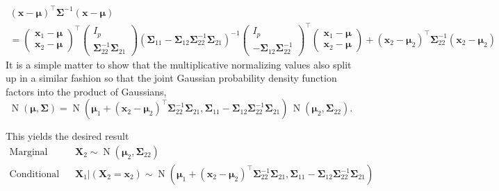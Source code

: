 \documentclass[12pt, twoside, draft]{article}
\begin{document}
\begin{multline}
(\mathbf{x} - \boldsymbol{\mu})^\top \boldsymbol{\Sigma}^{-1} (\mathbf{x} - \boldsymbol{\mu}) \\
= \begin{pmatrix} \mathbf{x}_1 - \boldsymbol{\mu} \\ \mathbf{x}_2 -\boldsymbol{\mu} \end{pmatrix}^\top
\begin{pmatrix} I_p \\  \boldsymbol{\Sigma}_{22}^{-1} \boldsymbol{\Sigma}_{21} \end{pmatrix}
 \left( \boldsymbol{\Sigma}_{11} - \boldsymbol{\Sigma}_{12} \boldsymbol{\Sigma}_{22}^{-1} \boldsymbol{\Sigma}_{21} \right)^{-1}
\begin{pmatrix} I_p \\ -\boldsymbol{\Sigma}_{12} \boldsymbol{\Sigma}_{22}^{-1} \end{pmatrix}^\top
\begin{pmatrix} \mathbf{x}_1 - \boldsymbol{\mu} \\ \mathbf{x}_2 -\boldsymbol{\mu} \end{pmatrix}
+ ( \mathbf{x}_2 - \boldsymbol{\mu}_2 )^\top \boldsymbol{\Sigma}_{22}^{-1} (\mathbf{x}_2 - \boldsymbol{\mu}_2)
\end{multline}
It is a simple matter to show that the multiplicative normalizing values also split up in a similar fashion so that the joint Gaussian probability density function factors into the product of Gaussians,
\begin{equation}
\operatorname{N}(\boldsymbol{\mu}, \boldsymbol{\Sigma}) = \operatorname{N}(\boldsymbol{\mu}_1 + (\mathbf{x}_2 - \boldsymbol{\mu}_2)^\top \boldsymbol{\Sigma}_{22}^{-1} \boldsymbol{\Sigma}_{21}, \boldsymbol{\Sigma}_{11} - \boldsymbol{\Sigma}_{12} \boldsymbol{\Sigma}_{22}^{-1} \boldsymbol{\Sigma}_{21}) \, \operatorname{N}(\boldsymbol{\mu}_2, \boldsymbol{\Sigma}_{22} ).
\end{equation}

This yields the desired result
\begin{align}
\text{Marginal Distribution:            } & \mathbf{X}_2 \sim \operatorname{N}(\boldsymbol{\mu}_2, \boldsymbol{\Sigma}_{22} )\\
\text{Conditional Distribution:   } & \mathbf{X}_1 | (\mathbf{X}_2 = \mathbf{x}_2) \sim \operatorname{N}(\boldsymbol{\mu}_1 + (\mathbf{x}_2 - \boldsymbol{\mu}_2)^\top \boldsymbol{\Sigma}_{22}^{-1} \boldsymbol{\Sigma}_{21}, \boldsymbol{\Sigma}_{11} - \boldsymbol{\Sigma}_{12} \boldsymbol{\Sigma}_{22}^{-1} \boldsymbol{\Sigma}_{21})
\end{align}
\end{document}
